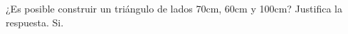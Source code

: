
{¿Es posible construir un triángulo de lados 70cm, 60cm y 100cm?
Justifica la respuesta.
}
{Si.
}
{
}

